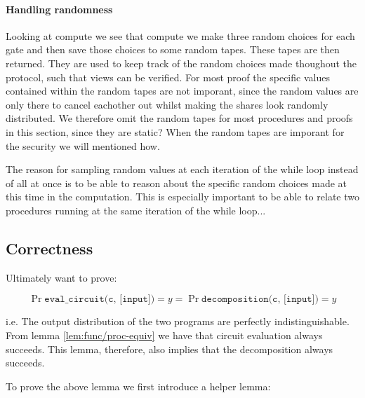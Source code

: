\paragraph{Handling randomness}
\label{subsec:decomp:randomness}
Looking at compute we see that compute we make three random choices for each gate and then save those choices to some random tapes. These tapes are then returned. They are used to keep track of the random choices made thoughout the protocol, such that views can be verified. For most proof the specific values contained within the random tapes are not imporant, since the random values are only there to cancel eachother out whilst making the shares look randomly distributed.
We therefore omit the random tapes for most procedures and proofs in this section, since they are static?
When the random tapes are imporant for the security we will mentioned how.

The reason for sampling random values at each iteration of the while loop
instead of all at once is to be able to reason about the specific random choices
made at this time in the computation. This is especially important to be able to
relate two procedures running at the same iteration of the while loop...


\subsection{Correctness}
\label{sec:decomp_correct}
Ultimately want to prove:
\begin{lemma}
  \label{lem:decomposition_correctness}

  \[
    \Pr{\texttt{eval\_circuit(c, [input])} = y} =
    \Pr{\texttt{decomposition(c, [input])} = y}
  \]

  i.e. The output distribution of the two programs are perfectly indistinguishable. From lemma \ref{lem:func/proc-equiv} we have that circuit evaluation always succeeds. This lemma, therefore, also implies that the decomposition always succeeds.
\end{lemma}

To prove the above lemma we first introduce a helper lemma:

